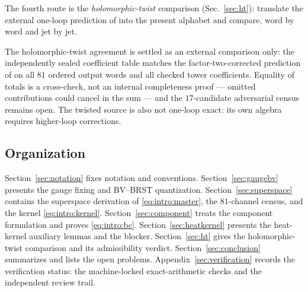 The fourth route is the \emph{holomorphic-twist} comparison (Sec.~\ref{sec:ht}): translate the external one-loop
prediction of \cite{BK} into the present alphabet and compare, word by word and jet by jet.
\begin{remark}\label{rem:intro:ht}
The holomorphic-twist agreement is settled as an external comparison only: the independently sealed coefficient table
matches the factor-two-corrected prediction of \cite{BK} on all $81$ ordered output words and all checked tower
coefficients. Equality of totals is a cross-check, not an internal completeness proof --- omitted contributions could
cancel in the sum --- and the $17$-candidate adversarial census remains open. The twisted source is also not one-loop
exact: its own algebra requires higher-loop corrections.
\end{remark}

\subsection{Organization}

Section~\ref{sec:notation} fixes notation and conventions. Section~\ref{sec:gaugebv} presents the gauge fixing and
BV--BRST quantization. Section~\ref{sec:superspace} contains the superspace derivation of \eqref{eq:intro:master}, the
$81$-channel census, and the kernel \eqref{eq:intro:kernel}. Section~\ref{sec:component} treats the component formulation
and proves \eqref{eq:intro:bc}. Section~\ref{sec:heatkernel} presents the heat-kernel auxiliary lemmas and the blocker.
Section~\ref{sec:ht} gives the holomorphic-twist comparison and its admissibility verdict. Section~\ref{sec:conclusion}
summarizes and lists the open problems. Appendix~\ref{sec:verification} records the verification status: the
machine-locked exact-arithmetic checks and the independent review trail.
